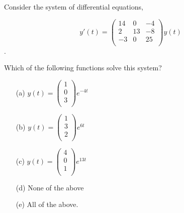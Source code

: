 \begin{problem}
    Consider the system of differential equations,

\[
y'(t) = \left( 
\begin{array}{ccc}
14 & 0 & -4 \\
2 & 13 & -8 \\
-3 & 0 & 25 \\
\end{array}
\right) y(t)
\].

Which of the following functions solve this system?
\begin{enumerate}
    \item[(a)]
        $y(t) = \left( \begin{array}{c} 1 \\ 0 \\ 3 \\ \end{array} \right) e^{-4 t}$
    \item[(b)]
        $y(t) = \left( \begin{array}{c} 1 \\ 3 \\ 2 \\ \end{array} \right) e^{6 t}$
    \item[(c)]
        $y(t) = \left( \begin{array}{c} 4 \\ 0 \\ 1 \\ \end{array} \right) e^{13 t}$
    \item[(d)] None of the above
    \item[(e)] All of the above.
\end{enumerate}

\end{problem}
%             

%             

